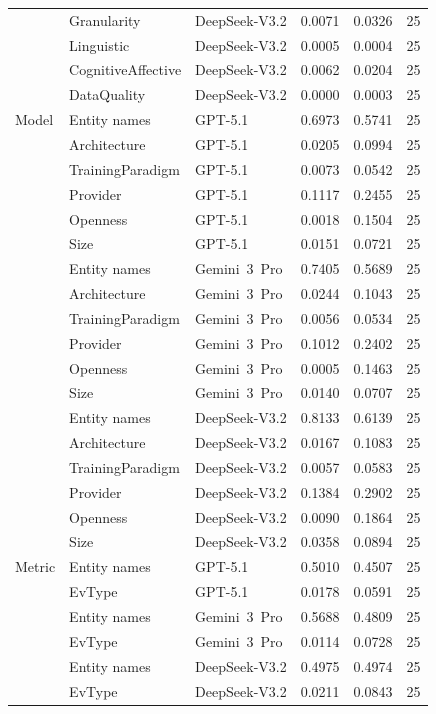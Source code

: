 \begin{tabular}{lllrrr}
 & Granularity & DeepSeek-V3.2 & 0.0071 & 0.0326 & 25 \\
 & Linguistic & DeepSeek-V3.2 & 0.0005 & 0.0004 & 25 \\
 & CognitiveAffective & DeepSeek-V3.2 & 0.0062 & 0.0204 & 25 \\
 & DataQuality & DeepSeek-V3.2 & 0.0000 & 0.0003 & 25 \\
Model & Entity names & GPT-5.1 & 0.6973 & 0.5741 & 25 \\
 & Architecture & GPT-5.1 & 0.0205 & 0.0994 & 25 \\
 & TrainingParadigm & GPT-5.1 & 0.0073 & 0.0542 & 25 \\
 & Provider & GPT-5.1 & 0.1117 & 0.2455 & 25 \\
 & Openness & GPT-5.1 & 0.0018 & 0.1504 & 25 \\
 & Size & GPT-5.1 & 0.0151 & 0.0721 & 25 \\
 & Entity names & Gemini~3~Pro & 0.7405 & 0.5689 & 25 \\
 & Architecture & Gemini~3~Pro & 0.0244 & 0.1043 & 25 \\
 & TrainingParadigm & Gemini~3~Pro & 0.0056 & 0.0534 & 25 \\
 & Provider & Gemini~3~Pro & 0.1012 & 0.2402 & 25 \\
 & Openness & Gemini~3~Pro & 0.0005 & 0.1463 & 25 \\
 & Size & Gemini~3~Pro & 0.0140 & 0.0707 & 25 \\
 & Entity names & DeepSeek-V3.2 & 0.8133 & 0.6139 & 25 \\
 & Architecture & DeepSeek-V3.2 & 0.0167 & 0.1083 & 25 \\
 & TrainingParadigm & DeepSeek-V3.2 & 0.0057 & 0.0583 & 25 \\
 & Provider & DeepSeek-V3.2 & 0.1384 & 0.2902 & 25 \\
 & Openness & DeepSeek-V3.2 & 0.0090 & 0.1864 & 25 \\
 & Size & DeepSeek-V3.2 & 0.0358 & 0.0894 & 25 \\
Metric & Entity names & GPT-5.1 & 0.5010 & 0.4507 & 25 \\
 & EvType & GPT-5.1 & 0.0178 & 0.0591 & 25 \\
 & Entity names & Gemini~3~Pro & 0.5688 & 0.4809 & 25 \\
 & EvType & Gemini~3~Pro & 0.0114 & 0.0728 & 25 \\
 & Entity names & DeepSeek-V3.2 & 0.4975 & 0.4974 & 25 \\
 & EvType & DeepSeek-V3.2 & 0.0211 & 0.0843 & 25 \\
\bottomrule
\end{tabular}